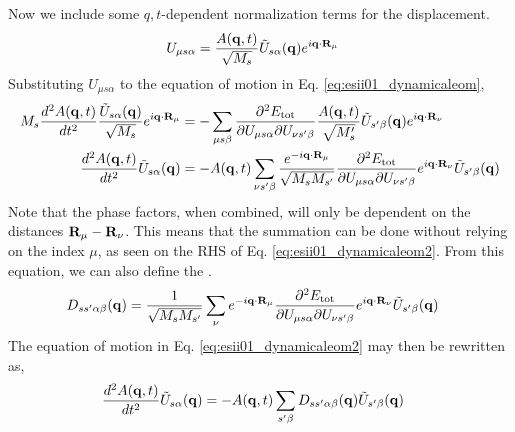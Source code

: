 Now we include some $q,t$-dependent normalization terms for the displacement.
\begin{align}
    U_{\mu s\alpha} &= \frac{A(\mathbf{q},t)}{\sqrt{M_s}}\tilde{U}_{s\alpha}(\mathbf{q})e^{i\mathbf{q}\cdot\mathbf{R}_\mu} \label{eq:esii01_dispwithnorm}
\end{align}
Substituting $U_{\mu s\alpha}$ to the equation of motion in Eq. \ref{eq:esii01_dynamicaleom},
\begin{align}
    M_s\frac{d^2A(\mathbf{q},t)}{dt^2}\frac{\tilde{U}_{s\alpha}(\mathbf{q})}{\sqrt{M_s}} e^{i\mathbf{q}\cdot\mathbf{R}_\mu} &= -\sum_{\mu s\beta} \frac{\partial^2E_\text{tot}}{\partial U_{\mu s\alpha} \partial U_{\nu s'\beta}} \frac{A(\mathbf{q},t)}{\sqrt{M_s'}}\tilde{U}_{s'\beta}(\mathbf{q}) e^{i\mathbf{q}\cdot\mathbf{R}_\nu} \notag\\
    \frac{d^2A(\mathbf{q},t)}{dt^2}\tilde{U}_{s\alpha}(\mathbf{q}) &= -A(\mathbf{q},t)\sum_{\nu s'\beta}\frac{e^{-i\mathbf{q}\cdot\mathbf{R}_\mu}}{\sqrt{M_sM_{s'}}}\frac{\partial^2E_\text{tot}}{\partial U_{\mu s\alpha} \partial U_{\nu s'\beta}}e^{i\mathbf{q}\cdot\mathbf{R}_\nu}\tilde{U}_{s'\beta}(\mathbf{q}) \label{eq:esii01_dynamicaleom2}
\end{align}
Note that the phase factors, when combined, will only be dependent on the distances $\mathbf{R}_\mu - \mathbf{R}_\nu$. This means that the summation can be done without relying on the index $\mu$, as seen on the RHS of Eq. \ref{eq:esii01_dynamicaleom2}. From this equation, we can also define the . 
\begin{align}
    D_{ss'\alpha\beta}(\mathbf{q}) &= \frac{1}{\sqrt{M_sM_{s'}}} \sum_\nu e^{-i\mathbf{q}\cdot\mathbf{R}_\mu}\frac{\partial^2E_\text{tot}}{\partial U_{\mu s\alpha} \partial U_{\nu s'\beta}}e^{i\mathbf{q}\cdot\mathbf{R}_\nu}\tilde{U}_{s'\beta}(\mathbf{q}) \label{eq:esii01_dynamat0}
\end{align}
The equation of motion in Eq. \ref{eq:esii01_dynamicaleom2} may then be rewritten as,
\begin{align}
    \frac{d^2A(\mathbf{q},t)}{dt^2}\tilde{U}_{s\alpha}(\mathbf{q}) &= -A(\mathbf{q},t)\sum_{s'\beta} D_{ss'\alpha\beta}(\mathbf{q})\tilde{U}_{s'\beta}(\mathbf{q}) \label{eq:esii01_dynamicaleom3}
\end{align}

